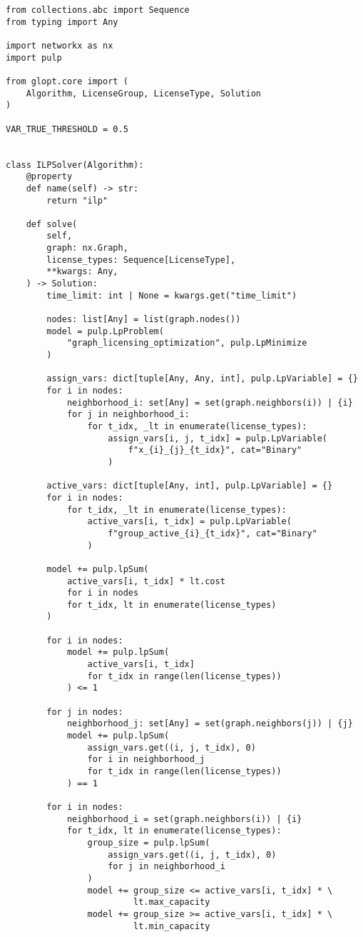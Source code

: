    {\footnotesize
        \begin{verbatim}
from collections.abc import Sequence
from typing import Any

import networkx as nx
import pulp

from glopt.core import (
    Algorithm, LicenseGroup, LicenseType, Solution
)

VAR_TRUE_THRESHOLD = 0.5


class ILPSolver(Algorithm):
    @property
    def name(self) -> str:
        return "ilp"

    def solve(
        self,
        graph: nx.Graph,
        license_types: Sequence[LicenseType],
        **kwargs: Any,
    ) -> Solution:
        time_limit: int | None = kwargs.get("time_limit")

        nodes: list[Any] = list(graph.nodes())
        model = pulp.LpProblem(
            "graph_licensing_optimization", pulp.LpMinimize
        )

        assign_vars: dict[tuple[Any, Any, int], pulp.LpVariable] = {}
        for i in nodes:
            neighborhood_i: set[Any] = set(graph.neighbors(i)) | {i}
            for j in neighborhood_i:
                for t_idx, _lt in enumerate(license_types):
                    assign_vars[i, j, t_idx] = pulp.LpVariable(
                        f"x_{i}_{j}_{t_idx}", cat="Binary"
                    )

        active_vars: dict[tuple[Any, int], pulp.LpVariable] = {}
        for i in nodes:
            for t_idx, _lt in enumerate(license_types):
                active_vars[i, t_idx] = pulp.LpVariable(
                    f"group_active_{i}_{t_idx}", cat="Binary"
                )

        model += pulp.lpSum(
            active_vars[i, t_idx] * lt.cost
            for i in nodes
            for t_idx, lt in enumerate(license_types)
        )

        for i in nodes:
            model += pulp.lpSum(
                active_vars[i, t_idx]
                for t_idx in range(len(license_types))
            ) <= 1

        for j in nodes:
            neighborhood_j: set[Any] = set(graph.neighbors(j)) | {j}
            model += pulp.lpSum(
                assign_vars.get((i, j, t_idx), 0)
                for i in neighborhood_j
                for t_idx in range(len(license_types))
            ) == 1

        for i in nodes:
            neighborhood_i = set(graph.neighbors(i)) | {i}
            for t_idx, lt in enumerate(license_types):
                group_size = pulp.lpSum(
                    assign_vars.get((i, j, t_idx), 0)
                    for j in neighborhood_i
                )
                model += group_size <= active_vars[i, t_idx] * \
                         lt.max_capacity
                model += group_size >= active_vars[i, t_idx] * \
                         lt.min_capacity


\end{verbatim}}
